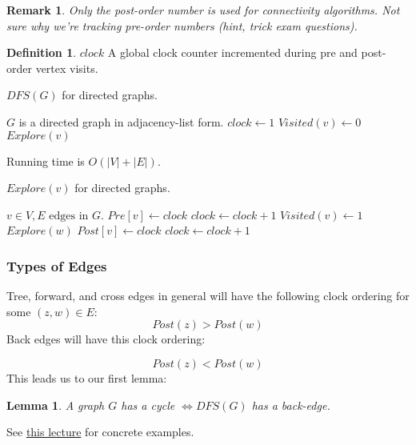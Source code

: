 \documentclass{article}
\newtheorem{lemma}[theorem]{Lemma}
\newtheorem{remark}{Remark}
\theoremstyle{definition}
\newtheorem{definition}{Definition}[section]
\begin{document}
\begin{remark}
	Only the post-order number is used for connectivity algorithms. Not sure why we're tracking
	pre-order numbers (hint, trick exam questions).
\end{remark}

\begin{definition}{$clock$}
A global clock counter incremented during pre and post-order vertex visits.
\end{definition}

\begin{algorithm}
\label{alg:dfs_dir}
\caption{$DFS(G)$ for directed graphs.}
\begin{algorithmic}[1]
\REQUIRE $G$ is a directed graph in adjacency-list form.
\STATE $clock \gets 1$ 
\STATE $Visited(v) \gets 0$
\ENDFOR
{}
\STATE $Explore(v)$
\ENDIF
\ENDFOR
\end{algorithmic}
 Running time is $O(|V|+|E|)$.
\end{algorithm}

\begin{algorithm}
\caption{$Explore(v)$ for directed graphs.}
\begin{algorithmic}[1]
\REQUIRE $v \in V, E \text{ edges in } G$.
\STATE$Pre[v] \gets clock$ 
\STATE $clock \gets clock + 1$
\STATE $Visited(v) \gets 1$
\STATE $Explore(w)$
\STATE $Post[v] \gets clock$ 
\STATE $clock \gets clock + 1$
\ENDIF
\ENDFOR
\end{algorithmic}
\end{algorithm}

\subsubsection{Types of Edges}
Tree, forward, and cross edges in general will have the following clock ordering for some $(z,w) \in E$: $$Post(z) > Post(w)$$ Back edges will have this clock ordering:

$$Post(z) < Post(w)$$ This leads us to our first lemma:
\begin{lemma}
\label{cycle}
	A graph $G$ has a cycle $\iff DFS(G)$ has a back-edge.
\end{lemma}

See \href{https://classroom.udacity.com/courses/ud401/lessons/10159691481/concepts/101975518340923}{this lecture} for concrete examples. 
\end{document}
